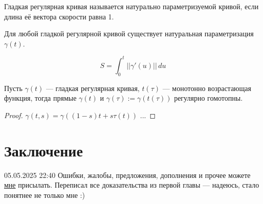 \begin{definition}
    Гладкая регулярная кривая называется натурально параметризуемой кривой, если длина её вектора скорости равна 1.
\end{definition} 

\begin{statement}
    Для любой гладкой регулярной кривой существует натуральная параметризация $\gamma(t)$.
\end{statement} 

$$S = \int_{0}^{t} ||\gamma'(u)|| \,du$$

\begin{statement}
    Пусть $\gamma(t)$ — гладкая регулярная кривая, $t(\tau)$ — монотонно возрастающая функция, тогда прямые $\gamma(t)$ и $\gamma(\tau):= \gamma(t(\tau))$ регулярно гомотопны.
\end{statement} 
\begin{proof}
    $\gamma(t,s) = \gamma\left((1-s)t + s \tau(t)\right)$ ...
\end{proof} 

\section{Заключение}
05.05.2025 22:40 Ошибки, жалобы, предложения, дополнения и прочее можете \href{https://t.me/egor_tsy}{мне} присылать. Переписал все доказательства из первой главы — надеюсь, стало понятнее не только мне :)